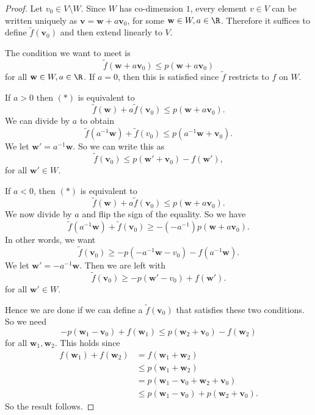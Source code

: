 \documentclass[a4paper]{article}
\begin{document}
\begin{proof}
  Let $v_0 \in V\setminus W$. Since $W$ has co-dimension $1$, every element $v\in V$ can be written uniquely as $\mathbf{v} = \mathbf{w} + a \mathbf{v}_0$, for some $\mathbf{w}\in W, a\in \R$. Therefore it suffices to define $\tilde{f}(\mathbf{v}_0)$ and then extend linearly to $V$.

  The condition we want to meet is
  \[
    \tilde{f}(\mathbf{w} + a \mathbf{v}_0) \leq p(\mathbf{w} + a \mathbf{v}_0)\tag{$*$}
  \]
  for all $\mathbf{w} \in W, a \in \R$. If $a = 0$, then this is satisfied since $\tilde{f}$ restricts to $f$ on $W$.

  If $a > 0$ then $(*)$ is equivalent to
  \[
    \tilde{f}(\mathbf{w}) + a\tilde{f}(\mathbf{v}_0) \leq p(\mathbf{w} + a \mathbf{v}_0).
  \]
  We can divide by $a$ to obtain
  \[
    \tilde{f}(a^{-1}\mathbf{w}) + \tilde{f}(v_0) \leq p(a^{-1}\mathbf{w} + \mathbf{v}_0).
  \]
  We let $\mathbf{w}' = a^{-1} \mathbf{w}$. So we can write this as
  \[
    \tilde{f}(\mathbf{v}_0) \leq p(\mathbf{w}' + \mathbf{v}_0) - f(\mathbf{w}'),
  \]
  for all $\mathbf{w}'\in W$.

  If $a < 0$, then $(*)$ is equivalent to
  \[
    \tilde{f}(\mathbf{w}) + a\tilde{f}(\mathbf{v}_0) \leq p(\mathbf{w} + a \mathbf{v}_0).
  \]
  We now divide by $a$ and flip the sign of the equality. So we have
  \[
    \tilde{f}(a^{-1}\mathbf{w}) + \tilde{f}(\mathbf{v}_0) \geq -(-a^{-1})p(\mathbf{w} + a\mathbf{v}_0).
  \]
  In other words, we want
  \[
    \tilde{f}(\mathbf{v}_0) \geq -p(-a^{-1} \mathbf{w} - v_0) - f(a^{-1}\mathbf{w}).
  \]
  We let $\mathbf{w}' = -a^{-1}\mathbf{w}$. Then we are left with
  \[
    \tilde{f}(\mathbf{v}_0) \geq -p(\mathbf{w}' - v_0) + f(\mathbf{w}').
  \]
  for all $\mathbf{w}' \in W$.

  Hence we are done if we can define a $\tilde{f}(\mathbf{v}_0)$ that satisfies these two conditions. So we need
  \[
    -p(\mathbf{w}_1 - \mathbf{v}_0) + f(\mathbf{w}_1) \leq p(\mathbf{w}_2 + \mathbf{v}_0) - f(\mathbf{w}_2)
  \]
  for all $\mathbf{w}_1, \mathbf{w}_2$. This holds since
  \begin{align*}
    f(\mathbf{w}_1) + f(\mathbf{w}_2) &= f(\mathbf{w}_1 + \mathbf{w}_2) \\
    &\leq p(\mathbf{w}_1 + \mathbf{w}_2) \\
    &= p(\mathbf{w}_1 - \mathbf{v}_0 + \mathbf{w}_2 + \mathbf{v}_0) \\
    &\leq p(\mathbf{w}_1 - \mathbf{v}_0) + p(\mathbf{w}_2 + \mathbf{v}_0).
  \end{align*}
  So the result follows.
\end{proof}
\end{document}
